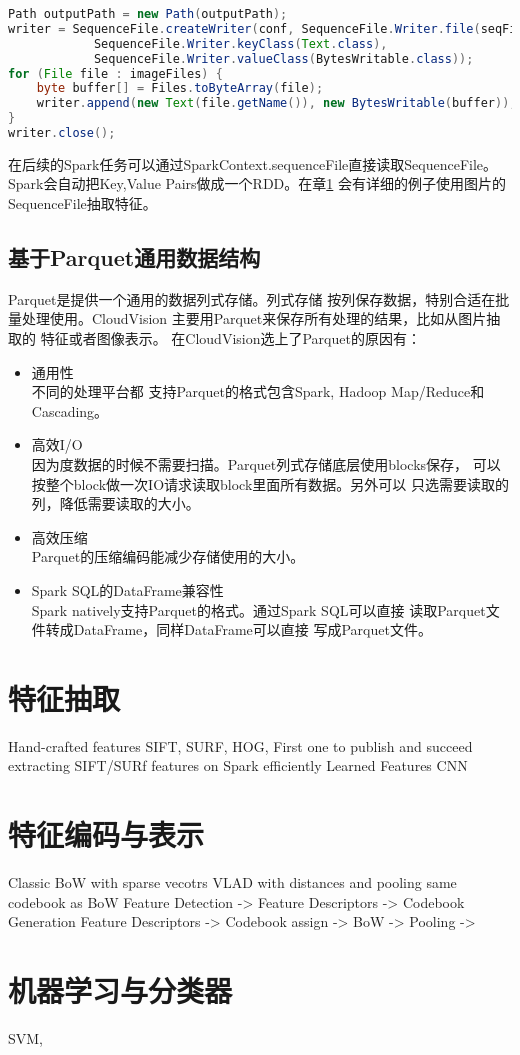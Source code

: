 \begin{lstlisting}[language=Java,
                   basicstyle=\tiny,
                   showstringspaces=false,
                   caption={UploadToSequenceFile工具},
                   label={lst:uploadseqfile}]
Path outputPath = new Path(outputPath);
writer = SequenceFile.createWriter(conf, SequenceFile.Writer.file(seqFilePath), 
            SequenceFile.Writer.keyClass(Text.class),
            SequenceFile.Writer.valueClass(BytesWritable.class));
for (File file : imageFiles) {
    byte buffer[] = Files.toByteArray(file);
    writer.append(new Text(file.getName()), new BytesWritable(buffer));
}
writer.close();
\end{lstlisting}

在后续的Spark任务可以通过SparkContext.sequenceFile直接读取SequenceFile。
Spark会自动把Key,Value Pairs做成一个RDD。在章\ref{sec:feature-extraction}
会有详细的例子使用图片的SequenceFile抽取特征。

\subsection{基于Parquet通用数据结构}
Parquet是提供一个通用的数据列式存储。列式存储
按列保存数据，特别合适在批量处理使用。CloudVision
主要用Parquet来保存所有处理的结果，比如从图片抽取的
特征或者图像表示。
在CloudVision选上了Parquet的原因有：
\begin{itemize}
  \item 通用性 \\
        不同的处理平台都
        支持Parquet的格式包含Spark, Hadoop Map/Reduce和Cascading。
  \item 高效I/O \\
        因为度数据的时候不需要扫描。Parquet列式存储底层使用blocks保存，
        可以按整个block做一次IO请求读取block里面所有数据。另外可以
        只选需要读取的列，降低需要读取的大小。
  \item 高效压缩 \\
        Parquet的压缩编码能减少存储使用的大小。
  \item Spark SQL的DataFrame兼容性 \\
        Spark natively支持Parquet的格式。通过Spark SQL可以直接
        读取Parquet文件转成DataFrame，同样DataFrame可以直接
        写成Parquet文件。
\end{itemize}



\section{特征抽取}
\label{sec:feature-extraction}
Hand-crafted features SIFT, SURF, HOG,
First one to publish and succeed extracting SIFT/SURf features on Spark efficiently
Learned Features CNN


\section{特征编码与表示}
Classic BoW with sparse vecotrs
VLAD with distances and pooling same codebook as BoW
Feature Detection -> Feature Descriptors -> Codebook Generation
Feature Descriptors -> Codebook assign -> BoW -> Pooling -> 


\section{机器学习与分类器}
SVM, 
